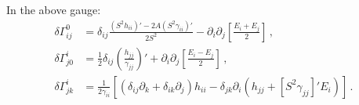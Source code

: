 \documentclass{article}
\newcommand*\p[1]{\left(#1\right)}
\newcommand*\ps[1]{\left[#1\right]}
\newcommand*\f[2]{\frac{#1}{#2}}
\begin{document}
In the above gauge:
\begin{align}
\delta\Gamma^0_{ij}&=\delta_{ij}\f{\p{S^2 h_{ii}}'-2A\p{S^2\gamma_{ii}}'}{2S^2}-\partial_i\partial_j\ps{\f{E_i+E_j}{2}}\,,\\
\delta\Gamma^i_{j0}&=\f12\delta_{ij}\p{\f{h_{jj}}{\gamma_{jj}}}'+\partial_i\partial_j\ps{\f{E_i-E_j}{2}}\,,\\
\delta\Gamma^i_{jk}&=\f{1}{2\gamma_{ii}}\ps{\p{\delta_{ij}\partial_k+\delta_{ik}\partial_j}h_{ii}-\delta_{jk}\partial_i\p{h_{jj}+\ps{S^2\gamma_{jj}}'E_i}}\,.
\end{align}
\end{document}
